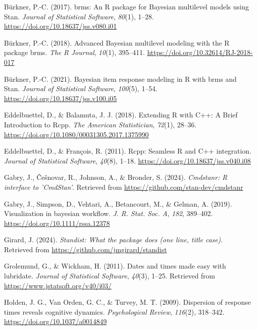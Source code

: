 \documentclass[
  man,floatsintext]{apa6}
\newlength{\cslhangindent}
\newenvironment{CSLReferences}[2] %
 {\begin{list}{}{%
  \setlength{\itemindent}{0pt}
  \setlength{\leftmargin}{0pt}
  \setlength{\parsep}{0pt}
  \ifodd #1
   \setlength{\leftmargin}{\cslhangindent}
   \setlength{\itemindent}{-1\cslhangindent}
  \fi
  \setlength{\itemsep}{#2\baselineskip}}}
 {\end{list}}
\begin{document}
\begin{CSLReferences}{1}{0}
Bürkner, P.-C. (2017). {brms}: An {R} package for {Bayesian} multilevel models using {Stan}. \emph{Journal of Statistical Software}, \emph{80}(1), 1--28. \url{https://doi.org/10.18637/jss.v080.i01}

Bürkner, P.-C. (2018). Advanced {Bayesian} multilevel modeling with the {R} package {brms}. \emph{The R Journal}, \emph{10}(1), 395--411. \url{https://doi.org/10.32614/RJ-2018-017}

Bürkner, P.-C. (2021). Bayesian item response modeling in {R} with {brms} and {Stan}. \emph{Journal of Statistical Software}, \emph{100}(5), 1--54. \url{https://doi.org/10.18637/jss.v100.i05}

Eddelbuettel, D., \& Balamuta, J. J. (2018). {Extending {R} with {C++}: A Brief Introduction to {Rcpp}}. \emph{The American Statistician}, \emph{72}(1), 28--36. \url{https://doi.org/10.1080/00031305.2017.1375990}

Eddelbuettel, D., \& François, R. (2011). {Rcpp}: Seamless {R} and {C++} integration. \emph{Journal of Statistical Software}, \emph{40}(8), 1--18. \url{https://doi.org/10.18637/jss.v040.i08}

Gabry, J., Češnovar, R., Johnson, A., \& Bronder, S. (2024). \emph{Cmdstanr: R interface to 'CmdStan'}. Retrieved from \url{https://github.com/stan-dev/cmdstanr}

Gabry, J., Simpson, D., Vehtari, A., Betancourt, M., \& Gelman, A. (2019). Visualization in bayesian workflow. \emph{J. R. Stat. Soc. A}, \emph{182}, 389--402. \url{https://doi.org/10.1111/rssa.12378}

Girard, J. (2024). \emph{Standist: What the package does (one line, title case)}. Retrieved from \url{https://github.com/jmgirard/standist}

Grolemund, G., \& Wickham, H. (2011). Dates and times made easy with {lubridate}. \emph{Journal of Statistical Software}, \emph{40}(3), 1--25. Retrieved from \url{https://www.jstatsoft.org/v40/i03/}

Holden, J. G., Van Orden, G. C., \& Turvey, M. T. (2009). Dispersion of response times reveals cognitive dynamics. \emph{Psychological Review}, \emph{116}(2), 318--342. \url{https://doi.org/10.1037/a0014849}


\end{CSLReferences}
\end{document}
